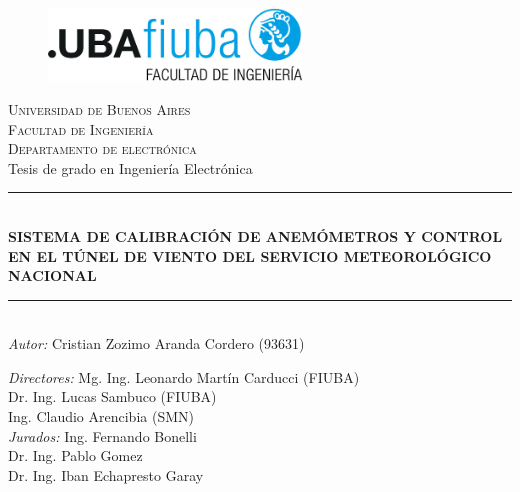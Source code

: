 \begin{titlepage}
\newcommand{\HRule}{\rule{\linewidth}{0.5mm}} 
\center 
\begin{figure}[H]
\centering
\includegraphics[width=0.6\textwidth]{fiuba_logo.jpg}
\end{figure}
\textsc{\large Universidad de Buenos Aires}\\[0.1cm] 
\textsc{\large Facultad de Ingeniería}\\[0.1cm]
\textsc{\large Departamento de electrónica}\\[1cm]

{\LARGE Tesis de grado en Ingeniería Electrónica} \\[0.1cm]

\HRule \\[0.1cm]
{\LARGE \bfseries SISTEMA DE CALIBRACIÓN DE ANEMÓMETROS Y CONTROL EN EL TÚNEL DE VIENTO DEL SERVICIO METEOROLÓGICO NACIONAL}\\
\HRule \\[0.1cm]

\Large \emph{Autor:} \Large Cristian Zozimo Aranda Cordero (93631) \\[0.1cm]
\begin{flushleft}
\Large \emph{Directores:} \hspace{0.5em} \Large Mg. Ing. Leonardo Martín Carducci (FIUBA) \\[0.1cm]
\hspace{6em}\Large  Dr. Ing. Lucas Sambuco (FIUBA) \\
\hspace{6em}\Large  Ing. Claudio Arencibia (SMN)\\[0.5cm]
\Large \emph{Jurados:} \hspace{1.5em} \Large Ing. Fernando Bonelli\\
\hspace{6em}\Large Dr. Ing. Pablo Gomez  \\
\hspace{6em}\Large Dr. Ing. Iban Echapresto Garay \\[1cm] 
\end{flushleft}
\vfill 
\end{titlepage}
